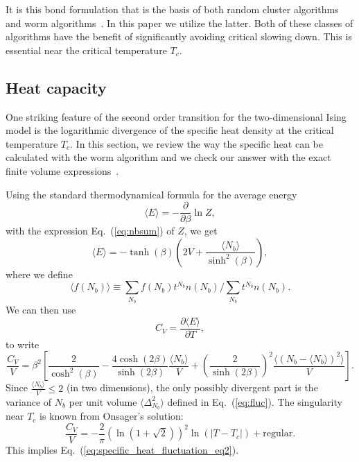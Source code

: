 \documentclass[../main.tex]{subfiles}
\begin{document}
It is this bond formulation that is the basis of both random cluster
algorithms~\cite{Swendsen:1987ce} and worm algorithms~\cite{prok87}.
%
In this paper we utilize the latter.  Both of these classes of algorithms have
the benefit of significantly avoiding critical slowing down.  This is essential
near the critical temperature $T_c$.  \subsection{Heat capacity}%
\label{ssec:heat_capacity} One striking feature of the second order transition
for the two-dimensional Ising model is the logarithmic divergence of the
specific heat density at the critical temperature $T_c$. In this section, we
review the way the specific heat can be calculated with the worm algorithm and
we check our answer with the exact finite volume expressions~\cite{bkaufman}.

Using the standard thermodynamical formula for the average energy
%
\begin{equation}
    \langle E \rangle = - \frac{\partial}{\partial \beta} \ln Z,
\end{equation}
%
with the expression Eq.~(\ref{eq:nbsum}) of  $Z$, we get
%
\begin{equation}
    \langle E \rangle = - \tanh(\beta)\left(2V + \frac{\langle
    N_b\rangle}{\sinh^2(\beta)}\right),
\end{equation}
%
where we define
%
\begin{equation}
\langle f(N_b)\rangle \equiv \sum_{N_b} f(N_b)t^{N_b}  n(N_b)/\sum_{N_b}t^{N_b}
n(N_b).
\end{equation}
%
We can then use
%
\begin{equation}
    C_{V} = \frac{\partial \langle E \rangle}{\partial T},
\end{equation}
%
to write
%
\begin{equation}
  \frac{C_V}{V} = \beta^2 {\left[\frac{2}{\cosh^2(\beta)} 
      - \frac{4\cosh(2\beta)}{\sinh(2\beta)}
      \frac{\langle N_b\rangle}{V}
      + {\left(\frac{2}{\sinh(2\beta)}\right)}^2\frac{\langle{(N_b 
  - \langle N_b\rangle)}^2\rangle}{V} \right]}.
\end{equation}
%
Since $\frac{\langle N_b\rangle}{V}\leq 2$ (in two dimensions), the only
possibly divergent part is the variance of $N_b$ per unit volume $\langle
\Delta_{N_b}^2\rangle$ defined in Eq.~(\ref{eq:fluc}). The singularity near
$T_c$ is known from Onsager's solution:
%
\begin{equation}
    \frac{C_V}{V} = -\frac{2}{\pi}{\left(\ln(1+\sqrt{2})\right)}^2
    \ln{\left(|T - T_c|\right)} + \text{regular}.
    \label{eq:onsager}
\end{equation}
%
This implies Eq.~(\ref{eq:specific_heat_fluctuation_eq2}).  
%
\end{document}
